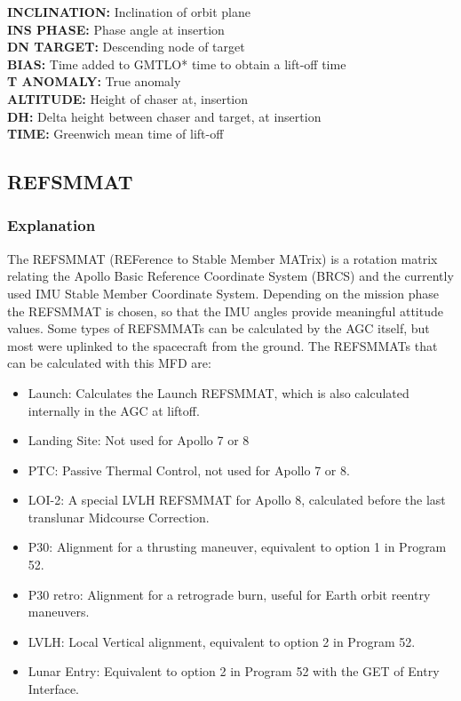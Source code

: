 \documentclass[11pt]{article} %
\begin{document}
\textbf{INCLINATION:} Inclination of orbit plane\\
\textbf{INS PHASE:} Phase angle at insertion\\
\textbf{DN TARGET:} Descending node of target\\
\textbf{BIAS:} Time added to GMTLO* time to obtain a lift-off time\\
\textbf{T ANOMALY:} True anomaly\\
\textbf{ALTITUDE:} Height of chaser at, insertion\\
\textbf{DH:} Delta height between chaser and target, at insertion\\
\textbf{TIME:} Greenwich mean time of lift-off\\

\newpage
\subsection{REFSMMAT}

\subsubsection{Explanation}

The REFSMMAT (REFerence to Stable Member MATrix) is a rotation matrix relating the Apollo Basic Reference Coordinate System (BRCS) and the currently used IMU Stable Member Coordinate System. Depending on the mission phase the REFSMMAT is chosen, so that the IMU angles provide meaningful attitude values. Some types of REFSMMATs can be calculated by the AGC itself, but most were uplinked to the spacecraft from the ground. The REFSMMATs that can be calculated with this MFD are:

\begin{itemize}
	\item{Launch: Calculates the Launch REFSMMAT, which is also calculated internally in the AGC at liftoff.}
	\item{Landing Site: Not used for Apollo 7 or 8}
	\item{PTC: Passive Thermal Control, not used for Apollo 7 or 8.}
	\item{LOI-2: A special LVLH REFSMMAT for Apollo 8, calculated before the last translunar Midcourse Correction.}
	\item{P30: Alignment for a thrusting maneuver, equivalent to option 1 in Program 52.}
	\item{P30 retro: Alignment for a retrograde burn, useful for Earth orbit reentry maneuvers.}
	\item{LVLH: Local Vertical alignment, equivalent to option 2 in Program 52.}
	\item{Lunar Entry: Equivalent to option 2 in Program 52 with the GET of Entry Interface.}
\end{itemize}
	
\end{document}
